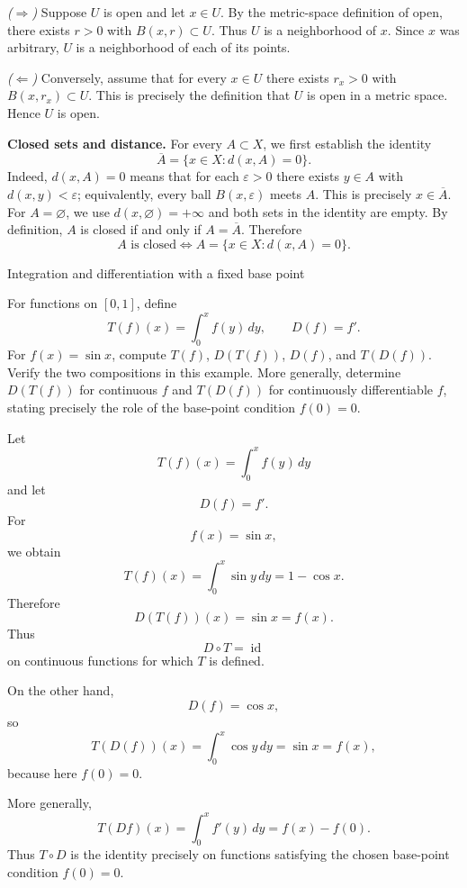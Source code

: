 \begin{solution}
\emph{($\Rightarrow$)} Suppose $U$ is open and let $x\in U$. By the metric-space definition of open, there exists $r>0$ with $B(x,r)\subset U$. Thus $U$ is a neighborhood of $x$. Since $x$ was arbitrary, $U$ is a neighborhood of each of its points.

	\smallskip
	\noindent
	\emph{($\Leftarrow$)} Conversely, assume that for every $x\in U$ there exists $r_x>0$ with $B(x,r_x)\subset U$. This is precisely the definition that $U$ is open in a metric space. Hence $U$ is open.

	\par\medskip\noindent\textbf{Closed sets and distance.}
For every $A\subset X$, we first establish the identity
\[
 \overline A=\{x\in X:d(x,A)=0\}.
\]
Indeed, $d(x,A)=0$ means that for each $\varepsilon>0$ there exists
$y\in A$ with $d(x,y)<\varepsilon$; equivalently, every ball
$B(x,\varepsilon)$ meets $A$. This is precisely $x\in\overline A$.
For $A=\varnothing$, we use $d(x,\varnothing)=+\infty$ and both sets
in the identity are empty. By definition, $A$ is closed if and only if
$A=\overline A$. Therefore
\[
 \boxed{A\text{ is closed}\iff A=\{x\in X:d(x,A)=0\}.}
\]
\end{solution}

\begin{problem}[CP-IV-0127]
\label{prob:cp-iv-0127}
Integration and differentiation with a fixed base point

For functions on $[0,1]$, define
\[
T(f)(x)=\int_0^x f(y)\,dy,\qquad D(f)=f'.
\]
For $f(x)=\sin x$, compute $T(f)$, $D(T(f))$, $D(f)$, and $T(D(f))$. Verify the two compositions in this example. More generally, determine $D(T(f))$ for continuous $f$ and $T(D(f))$ for continuously differentiable $f$, stating precisely the role of the base-point condition $f(0)=0$.
\end{problem}

\begin{solution}
Let
\[
T(f)(x)=\int_0^x f(y)\,dy
\]
and let
\[
D(f)=f'.
\]
For
\[
f(x)=\sin x,
\]
we obtain
\[
T(f)(x)
=
\int_0^x\sin y\,dy
=
1-\cos x.
\]
Therefore
\[
D(T(f))(x)=\sin x=f(x).
\]
Thus
\[
D\circ T=\operatorname{id}
\]
on continuous functions for which \(T\) is defined.

On the other hand,
\[
D(f)=\cos x,
\]
so
\[
T(D(f))(x)
=
\int_0^x\cos y\,dy
=
\sin x
=
f(x),
\]
because here \(f(0)=0\).

More generally,
\[
T(Df)(x)
=
\int_0^x f'(y)\,dy
=
f(x)-f(0).
\]
Thus \(T\circ D\) is the identity precisely on functions satisfying the chosen base-point condition \(f(0)=0\).
\end{solution}


